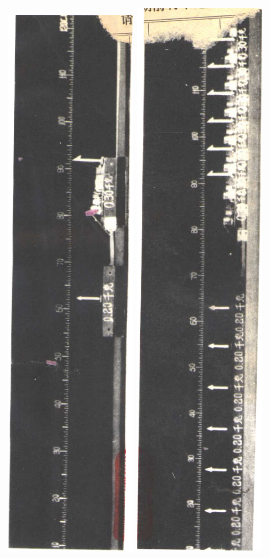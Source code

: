 \begin{figure}[htbp]
    \centering
    \begin{minipage}[t]{0.24\linewidth}
        \centering
        \includegraphics[width=3.3cm]{fig/A/8-3.png}
        \caption{}\label{fig_A_8-3}
    \end{minipage}
    \hfill
    \begin{minipage}[t]{0.24\linewidth}
        \centering
        \includegraphics[width=3.3cm]{fig/A/8-4.png}

\end{minipage}
\end{figure}
